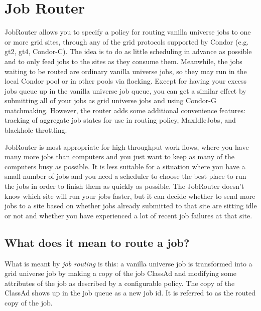 \section{\label{sec:JobRouter}Job Router}

JobRouter allows you to specify a policy for routing vanilla universe
jobs to one or more grid sites, through any of the grid protocols
supported by Condor (e.g. gt2, gt4, Condor-C). The idea is to do as
little scheduling in advance as possible and to only feed jobs to the
sites as they consume them. Meanwhile, the jobs waiting to be routed
are ordinary vanilla universe jobs, so they may run in the local
Condor pool or in other pools via flocking. Except for having your
excess jobs queue up in the vanilla universe job queue, you can get a
similar effect by submitting all of your jobs as grid universe jobs
and using Condor-G matchmaking.  However, the router adds some
additional convenience features: tracking of aggregate job states for
use in routing policy, MaxIdleJobs, and blackhole throttling.

JobRouter is most appropriate for high throughput work flows, where you
have many more jobs than computers and you just want to keep as many
of the computers busy as possible.  It is less suitable for a
situation where you have a small number of jobs and you need a
scheduler to choose the best place to run the jobs in order to finish
them as quickly as possible.  The JobRouter doesn't know which site
will run your jobs faster, but it can decide whether to send more jobs
to a site based on whether jobs already submitted to that site are
sitting idle or not and whether you have experienced a lot of recent
job failures at that site.

\subsection{What does it mean to route a job?}

What is meant by \textit{job routing} is this: a vanilla universe job is
transformed into a grid universe job by making a copy of the job
ClassAd and modifying some attributes of the job as described by a
configurable policy.  The copy of the ClassAd shows up in the job
queue as a new job id.  It is referred to as the routed copy of the
job.

